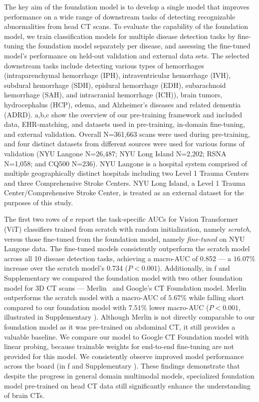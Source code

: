 \documentclass[fleqn,10pt]{wlscirep}
\begin{document}
The key aim of the foundation model is to develop a single model that improves performance on a wide range of downstream tasks of detecting recognizable abnormalities from head CT scans. To evaluate the capability of the foundation model, we train classification models for multiple disease detection tasks by fine-tuning the foundation model separately per disease, and assessing the fine-tuned model's performance on held-out validation and external data sets. The selected downstream tasks include detecting various types of hemorrhages (intraparenchymal hemorrhage (IPH), intraventricular hemorrhage (IVH), subdural hemorrhage (SDH), epidural hemorrhage (EDH), subarachnoid hemorrhage (SAH), and intracranial hemorrhage (ICH)), brain tumors, hydrocephalus (HCP), edema, and Alzheimer's diseases and related dementia (ADRD). a,b,c show the overview of our pre-training framework and included data, EHR-matching, and datasets used in pre-training, in-domain fine-tuning, and external validation. Overall N=361,663 scans were used during pre-training, and four distinct datasets from different sources were used for various forms of validation (NYU Langone N=26,487; NYU Long Island N=2,202; RSNA N=1,058; and CQ500 N=236). NYU Langone is a hospital system comprised of multiple geographically distinct hospitals including two Level 1 Trauma Centers and three Comprehensive Stroke Centers. NYU Long Island, a Level 1 Trauma Center/Comprehensive Stroke Center, is treated as an external dataset for the purposes of this study. 

The first two rows of e report the task-specific AUCs for Vision Transformer (ViT) classifiers trained from scratch with random initialization, namely \textit{scratch}, versus those fine-tuned from the foundation model, namely \textit{fine-tuned} on NYU Langone data. The fine-tuned models consistently outperform the scratch model across all 10 disease detection tasks, achieving a macro-AUC of 0.852 --- a $16.07\%$ increase over the scratch model’s 0.734 ($P<0.001$). Additionally, in f and Supplementary  we compared the foundation model with two other foundation model for 3D CT scans --- Merlin~\cite{blankemeier2024merlinvisionlanguagefoundation} and Google's CT Foundation\cite{yang2024advancing} model. Merlin outperforms the scratch model with a macro-AUC of $5.67\%$ while falling short compared to our foundation model with $7.51\%$ lower macro-AUC ($P<0.001$, illustrated in Supplementary ). Although Merlin is not directly comparable to our foundation model as it was pre-trained on abdominal CT, it still provides a valuable baseline. We compare our model to Google CT Foundation model with linear probing, because trainable weights for end-to-end fine-tuning are not provided for this model. We consistently observe improved model performance across the board (in f and Supplementary ). %
These findings demonstrate that despite the progress in general domain multimodal models, specialized foundation model pre-trained on head CT data still significantly enhance the understanding of brain CTs. 
\end{document}
